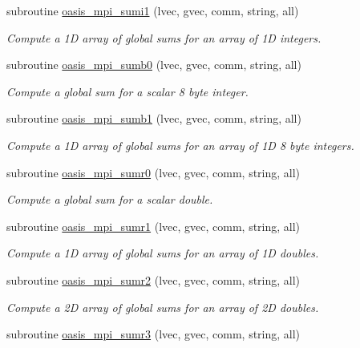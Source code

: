 \begin{DoxyCompactItemize}
subroutine \hyperlink{namespacemod__oasis__mpi_a507bb5e0ae088d68bb68c566e8965bef}{oasis\+\_\+mpi\+\_\+sumi1} (lvec, gvec, comm, string, all)
\begin{DoxyCompactList}\small\item\em Compute a 1D array of global sums for an array of 1D integers. \end{DoxyCompactList}\item 
subroutine \hyperlink{namespacemod__oasis__mpi_ae4d2818f21f445e594aad97598f49d8e}{oasis\+\_\+mpi\+\_\+sumb0} (lvec, gvec, comm, string, all)
\begin{DoxyCompactList}\small\item\em Compute a global sum for a scalar 8 byte integer. \end{DoxyCompactList}\item 
subroutine \hyperlink{namespacemod__oasis__mpi_a3f32594b15b9ae3629969839ab952012}{oasis\+\_\+mpi\+\_\+sumb1} (lvec, gvec, comm, string, all)
\begin{DoxyCompactList}\small\item\em Compute a 1D array of global sums for an array of 1D 8 byte integers. \end{DoxyCompactList}\item 
subroutine \hyperlink{namespacemod__oasis__mpi_a02b0555479a3d54e1c3d42219af9b991}{oasis\+\_\+mpi\+\_\+sumr0} (lvec, gvec, comm, string, all)
\begin{DoxyCompactList}\small\item\em Compute a global sum for a scalar double. \end{DoxyCompactList}\item 
subroutine \hyperlink{namespacemod__oasis__mpi_aac62148bc912b158aff769572f27b8d3}{oasis\+\_\+mpi\+\_\+sumr1} (lvec, gvec, comm, string, all)
\begin{DoxyCompactList}\small\item\em Compute a 1D array of global sums for an array of 1D doubles. \end{DoxyCompactList}\item 
subroutine \hyperlink{namespacemod__oasis__mpi_afbc665ae71c97d0b0467323cd86a5973}{oasis\+\_\+mpi\+\_\+sumr2} (lvec, gvec, comm, string, all)
\begin{DoxyCompactList}\small\item\em Compute a 2D array of global sums for an array of 2D doubles. \end{DoxyCompactList}\item 
subroutine \hyperlink{namespacemod__oasis__mpi_a41836fe23aeb81e65b4d24f6f0c90953}{oasis\+\_\+mpi\+\_\+sumr3} (lvec, gvec, comm, string, all)

\end{DoxyCompactItemize}
